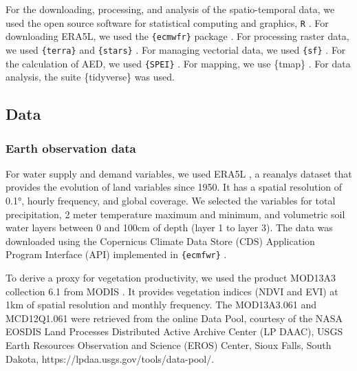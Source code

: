 \documentclass[
  authoryear,
  preprint,
  3p,
  onecolumn]{elsarticle}
\begin{document}
For the downloading, processing, and analysis of the spatio-temporal
data, we used the open source software for statistical computing and
graphics, \texttt{R} \citep{R2023}. For downloading ERA5L, we used the
\texttt{\{ecmwfr\}} package \citep{Hufkens2019}. For processing raster
data, we used \texttt{\{terra\}} \citep{Hijmans2023} and
\texttt{\{stars\}} \citep{Pebesma2023}. For managing vectorial data, we
used \texttt{\{sf\}} \citep{Pebesma2018}. For the calculation of AED, we
used \texttt{\{SPEI\}} \citep{Bergueria2023}. For mapping, we use
\{tmap\} \citep{Tennekes2018}. For data analysis, the suite
\{tidyverse\} \citep{Wickham2019} was used.

\hypertarget{data}{%
\subsection{Data}\label{data}}

\hypertarget{earth-observation-data}{%
\subsubsection{Earth observation data}\label{earth-observation-data}}

For water supply and demand variables, we used ERA5L
\citep{MunozSabater2021}, a reanalys dataset that provides the evolution
of land variables since 1950. It has a spatial resolution of 0.1°,
hourly frequency, and global coverage. We selected the variables for
total precipitation, 2 meter temperature maximum and minimum, and
volumetric soil water layers between 0 and 100cm of depth (layer 1 to
layer 3). The data was downloaded using the Copernicus Climate Data
Store (CDS) Application Program Interface (API) implemented in
\texttt{\{ecmfwr\}} \citep{Hufkens2019}.

To derive a proxy for vegetation productivity, we used the product
MOD13A3 collection 6.1 from MODIS \citep{Didan2015}. It provides
vegetation indices (NDVI and EVI) at 1km of spatial resolution and
monthly frequency. The MOD13A3.061 and MCD12Q1.061 were retrieved from
the online Data Pool, courtesy of the NASA EOSDIS Land Processes
Distributed Active Archive Center (LP DAAC), USGS Earth Resources
Observation and Science (EROS) Center, Sioux Falls, South Dakota,
https://lpdaa.usgs.gov/tools/data-pool/.
\end{document}
